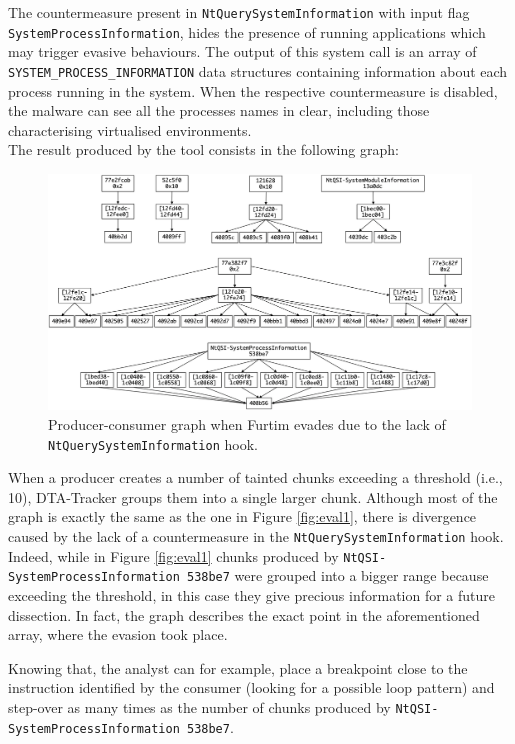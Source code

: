 \documentclass[LaM,binding=0.6cm]{sapthesis}
\begin{document}
The countermeasure present in \texttt{NtQuerySystemInformation} with input flag \texttt{SystemProcessInformation}, hides the presence of running applications which may trigger evasive behaviours. The output of this system call is an array of \texttt{SYSTEM\_PROCESS\_INFORMATION} data structures containing information about each process running in the system. When the respective countermeasure is disabled, the malware can see all the processes names in clear, including those characterising virtualised environments.\\

\noindent The result produced by the tool consists in the following graph:

\begin{figure}[h!]
\centering%
\includegraphics[width=\textwidth]{images/eval2_def}
\caption{Producer-consumer graph when Furtim evades due to the lack of \texttt{NtQuerySystemInformation} hook.}
\end{figure}

\noindent
When a producer creates a number of tainted chunks exceeding a threshold (i.e., 10), {\sf DTA-Tracker} groups them into a single larger chunk. Although most of the graph is exactly the same as the one in Figure \autoref{fig:eval1}, there is divergence caused by the lack of a countermeasure in the \texttt{NtQuerySystemInformation} hook. Indeed, while in Figure \autoref{fig:eval1} chunks produced by \texttt{NtQSI-SystemProcessInformation 538be7} were grouped into a bigger range because exceeding the threshold, in this case they give precious information for a future dissection. In fact, the graph describes the exact point in the aforementioned array, where the evasion took place.
 
Knowing that, the analyst can for example, place a breakpoint close to the instruction identified by the consumer (looking for a possible loop pattern) and step-over as many times as the number of chunks produced by \texttt{NtQSI-SystemProcessInformation 538be7}.\\
\end{document}
